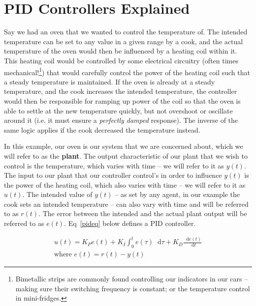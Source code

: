 \documentclass[10pt,twocolumn,letterpaper]{article}
\newcommand*\diff{\mathop{}\!\mathrm{d}} %
\begin{document}
    \section{PID Controllers Explained} \label{pidexplained}

        Say we had an oven that we wanted to control the temperature of. The intended temperature can be set to any
        value in a given range by a cook, and the actual temperature of the oven would then be influenced by a heating
        coil within it. This heating coil would be controlled by some electrical circuitry (often times
        mechanical!\footnote{Bimetallic strips are commonly found controlling our indicators in our cars -- making sure
        their switching frequency is constant; or the temperature control in mini-fridges.}) that would carefully
        control the power of the heating coil such that a steady temperature is maintained. If the oven is already at a
        steady temperature, and the cook increases the intended temperature, the controller would then be responsible
        for ramping up power of the coil so that the oven is able to settle at the new temperature quickly, but not
        overshoot or oscillate around it (i.e. it must ensure a \textit{perfectly damped} response). The inverse of the
        same logic applies if the cook decreased the temperature instead.

        In this example, our oven is our system that we are concerned about, which we will refer to as the
        \textbf{plant}. The output characteristic of our plant that we wish to control is the temperature, which varies
        with time -- we will refer to it as $y(t)$. The input to our plant that our controller control's in order to
        influence $y(t)$ is the power of the heating coil, which also varies with time -- we will refer to it as $u(t)$.
        The intended value of $y(t)$ -- as set by any agent, in our example the cook sets an intended temperature -- can
        also vary with time and will be referred to as $r(t)$. The error between the intended and the actual plant
        output will be referred to as $e(t)$. Eq~\ref{pideq} below defines a PID controller.
        
        \begin{equation} \label{pideq}
            \begin{gathered}
                u(t) = K_P e(t) + K_I \int_0^t e(\tau) \diff\tau + K_D \frac{\diff e(t)}{\diff t} \\
                \text{where } e(t) = r(t) - y(t)
            \end{gathered}
        \end{equation}
        
\end{document}
